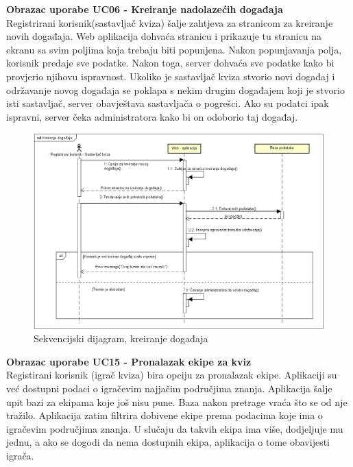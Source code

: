 				\eject

				\textbf{Obrazac uporabe UC06 - Kreiranje nadolazećih događaja}\\
				
				Registrirani korisnik(sastavljač kviza) šalje zahtjeva za stranicom za kreiranje novih događaja. Web aplikacija dohvaća stranicu i prikazuje tu stranicu na ekranu sa svim poljima koja trebaju biti popunjena. Nakon popunjavanja polja, korisnik predaje sve podatke. Nakon toga, server dohvaća sve podatke kako bi provjerio njihovu ispravnost. Ukoliko je sastavljač kviza stvorio novi događaj i održavanje novog događaja se poklapa s nekim drugim događajem koji je stvorio isti sastavljač, server obavještava sastavljača o pogrešci. Ako su podatci ipak ispravni, server čeka administratora kako bi on odoborio taj događaj.
				
				\begin{figure}[H]
					\includegraphics[width=\textwidth]{dijagrami/SeqDiagram2.PNG} 
					\caption{Sekvencijski dijagram, kreiranje događaja}
					\label{fig:SeqDiagram2}
				\end{figure}
				
				\eject
				
				\textbf{Obrazac uporabe UC15 - Pronalazak ekipe za kviz}\\
				
				Registirani korisnik (igrač kviza) bira opciju za pronalazak ekipe. Aplikaciji su već dostupni podaci o igračevim najjačim područjima znanja. Aplikacija šalje upit bazi za ekipama koje još nisu pune. Baza nakon pretrage vraća što se od nje tražilo. Aplikacija zatim filtrira dobivene ekipe prema podacima koje ima o igračevim područjima znanja. U slučaju da takvih ekipa ima više, dodjeljuje mu jednu, a ako se dogodi da nema dostupnih ekipa, aplikacija o tome obavijesti igrača.
				
